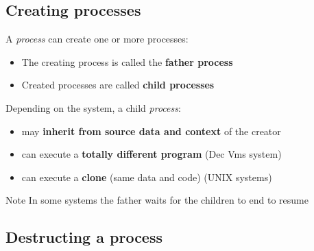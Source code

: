 \documentclass{beamer}[10pt, usepdftitle=false, handout]
\begin{document}
	\subsection{Creating processes}	
	
	\begin{frame}
	
	A \textit{process} can create one or more processes\footnotemark[2]:
	\vspace*{1em}
	\begin{itemize}
	\item{The creating process is called the \textbf{father process}}
	\item{Created processes are called \textbf{child processes}}
	\end{itemize}		
	
	\vspace*{1em}
	
	Depending on the system, a child \textit{process}:
	
	\begin{itemize}
	\item{may \textbf{inherit from source data and context} of the creator}
	\item{can execute a \textbf{totally different program} (Dec Vms system)}
	\item{can execute a \textbf{clone} (same data and code) (UNIX systems)}
	\end{itemize}		
	
	\begin{block}{Note}
	In some systems the father waits for the children to end to resume 
	\end{block}	
	
	
	\end{frame}	
	
	\subsection{Destructing a process}
	
\end{document}

